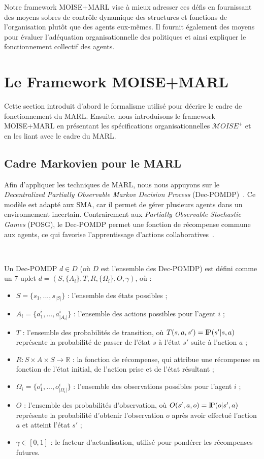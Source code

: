 \documentclass[sigconf,anonymous]{aamas}
\newcommand{\probP}{\text{I\kern-0.15em P}}
\begin{document}
\noindent Notre framework MOISE+MARL vise à mieux adresser ces défis en fournissant des moyens sobres de contrôle dynamique des structures et fonctions de l'organisation plutôt que des agents eux-mêmes. Il fournit également des moyens pour évaluer l'adéquation organisationnelle des politiques et ainsi expliquer le fonctionnement collectif des agents.

\section{Le Framework MOISE+MARL}
\label{sec:moise_marl_framework}

Cette section introduit d'abord le formalisme utilisé pour décrire le cadre de fonctionnement du MARL. Ensuite, nous introduisons le framework MOISE+MARL en présentant les spécifications organisationnelles $\mathcal{M}OISE^+$ et en les liant avec le cadre du MARL.

\subsection{Cadre Markovien pour le MARL}

Afin d'appliquer les techniques de MARL, nous nous appuyons sur le \textit{Decentralized Partially Observable Markov Decision Process} (Dec-POMDP)~\citep{Oliehoek2016}. Ce modèle est adapté aux SMA, car il permet de gérer plusieurs agents dans un environnement incertain. Contrairement aux \textit{Partially Observable Stochastic Games} (POSG), le Dec-POMDP permet une fonction de récompense commune aux agents, ce qui favorise l'apprentissage d'actions collaboratives~\citep{Beynier2013}.

\

Un Dec-POMDP $d \in D$ (où $D$ est l'ensemble des Dec-POMDP) est défini comme un 7-uplet $d = (S, \{A_i\}, T, R, \{\Omega_i\}, O, \gamma)$, où :

\begin{itemize}
    \item $S = \{s_1,...,s_{|S|}\}$ : l'ensemble des états possibles ;
    \item $A_{i} = \{a_{1}^{i},...,a_{|A_{i}|}^{i}\}$ : l'ensemble des actions possibles pour l'agent $i$ ;
    \item $T$ : l'ensemble des probabilités de transition, où $T(s,a,s') = \probP(s'|s,a)$ représente la probabilité de passer de l'état $s$ à l'état $s'$ suite à l'action $a$ ;
    \item $R: S \times A \times S \rightarrow \mathbb{R}$ : la fonction de récompense, qui attribue une récompense en fonction de l'état initial, de l'action prise et de l'état résultant ;
    \item $\Omega_{i} = \{o_{1}^{i},...,o_{|\Omega_{i}|}^{i}\}$ : l'ensemble des observations possibles pour l'agent $i$ ;
    \item $O$ : l'ensemble des probabilités d'observation, où $O(s',a,o) = \probP(o|s',a)$ représente la probabilité d'obtenir l'observation $o$ après avoir effectué l'action $a$ et atteint l'état $s'$ ;
    \item $\gamma \in [0,1]$ : le facteur d'actualisation, utilisé pour pondérer les récompenses futures.
\end{itemize}
\end{document}
